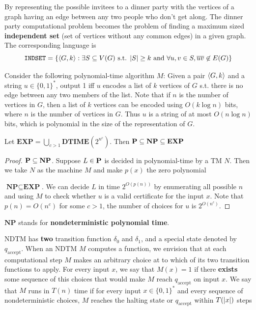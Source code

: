 \documentclass[11pt]{article}
\def \EXP {\textbf{EXP}}
\def \NP {\textbf{NP}}
\def \DTIME {\textbf{DTIME}}
\def \NP {\textbf{NP}}
\def \INDSET {\texttt{INDSET}}
\def \accept {\text{accept}}
\begin{document}
\begin{examplle}[\(\INDSET\in\NP\)]
By representing the possible invitees to a dinner party with the vertices of a graph having an
edge between any two people who don't get along. The dinner party computational problem becomes
the problem of finding a maximum sized \textbf{independent set} (set of vertices without any common
edges) in a given graph. The corresponding language is
     \begin{equation*}
\INDSET=\{\la G,k\ra:\exists S\subseteq V(G)\text{ s.t. }\abs{S}\ge k\text{ and }\forall u,v\in S, \ove{uv}\not\in E(G)\}
     \end{equation*}

Consider the following polynomial-time algorithm \(M\): Given a pair \(\langle G,k\rangle\) and a
string \(u\in\{0,1\}^*\), output 1 iff \(u\) encodes a list of \(k\) vertices of \(G\) s.t.
there is no edge between any two members of the list. Note that if \(n\) is the number of
vertices in \(G\), then a list of \(k\) vertices can be encoded using \(O(k\log n)\) bits,
where \(n\) is the number of vertices in \(G\). Thus \(u\) is a string of at
most \(O(n\log n)\) bits, which is polynomial in the size of the representation of \(G\).
\end{examplle}

\begin{proposition}[]
Let \(\EXP=\bigcup_{c>1}\DTIME(2^{n^c})\). Then \(\bP\subseteq\NP\subseteq\EXP\)
\end{proposition}

\begin{proof}
\(\bP\subseteq\NP\). Suppose \(L\in\operatorname{\textbf{P}}\) is decided in polynomial-time by a TM \(N\).
Then we take \(N\) as the machine \(M\) and make \(p(x)\) the zero polynomial

\(\NP\subseteq\EXP\). We can decide \(L\) in time \(2^{O(p(n))}\)  by enumerating all
possible \(n\) and using \(M\) to check whether \(u\) is a valid certificate for the
input \(x\). Note that \(p(n)=O(n^c)\) for some \(c>1\), the number of choices for \(u\) is \(2^{O(n^c)}\).
\end{proof}

\(\NP\) stands for \textbf{nondeterministic polynomial time}.

NDTM has \textbf{two} transition function \(\delta_0\) and \(\delta_1\), and a special state denoted
by \(q_{\accept}\). When an NDTM \(M\) computes a function, we envision that at each
computational step \(M\) makes an arbitrary choice at to which of its two transition functions
to apply. For every input \(x\), we say that \(M(x)=1\) if there \textbf{exists} some sequence of this
choices that would make \(M\) reach \(q_{\accept}\) on input \(x\). We say that \(M\) runs
in \(T(n)\) time if for every input \(x\in\{0,1\}^*\) and every sequence of nondeterministic
choices, \(M\) reaches the halting state or \(q_{\accept}\) within \(T(\abs{x})\) steps
\end{document}
